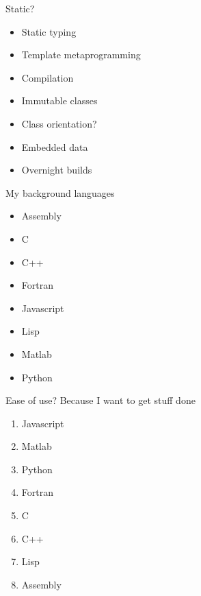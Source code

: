 \documentclass[20pt]{beamer}
\begin{document}
\begin{frame}{Static?}
  \begin{itemize}
  \item Static typing
  \item Template metaprogramming
  \item Compilation
  \item Immutable classes
  \item Class orientation?
  \item Embedded data
  \item Overnight builds
  \end{itemize}
\end{frame}



\begin{frame}{My background languages}
  \begin{multicols}{2}
    \begin{itemize}
    \item Assembly
    \item C
    \item C++
    \item Fortran
    \item Javascript
    \item Lisp
    \item Matlab
    \item Python
    \end{itemize}
  \end{multicols}
\end{frame}

\begin{frame}{Ease of use?}
  Because I want to get stuff done
  \begin{multicols}{2}
    \begin{enumerate}
    \item Javascript
    \item Matlab
    \item Python
    \item Fortran
    \item C
    \item C++
    \item Lisp
    \item Assembly
    \end{enumerate}
  \end{multicols}
\end{frame}
\end{document}
